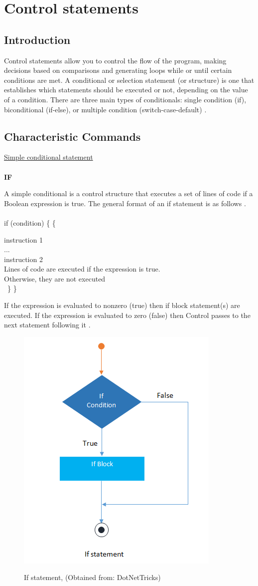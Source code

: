 \documentclass[11pt, letterpaper, english]{article}
\begin{document}
\newpage 
\section{Control statements}
\subsection{Introduction}
\par{Control statements allow you to control the flow of the program, making decisions based on comparisons and generating loops while or until certain conditions are met. A conditional or selection statement (or structure) is one that establishes which statements should be executed or not, depending on the value of a condition. There are three main types of conditionals: single condition (if), biconditional (if-else), or multiple condition (switch-case-default)} \cite{iscyp_2017}.
    \subsection{Characteristic Commands}
    \vspace{1 cm}
    \underline{Simple conditional statement}
   \\
    \\
    \textbf{IF}
    \par{A simple conditional is a control structure that executes a set of lines of code if a Boolean expression is true. The general format of an if statement is as follows \cite{tiwari_2022}}.
    \\
    \\
    if (condition) \{ \{
    
    instruction 1
     \\
     ...
     \\
     instruction 2
     \\
     Lines of code are executed if the expression is true.
     \\
     Otherwise, they are not executed
     \\
\
\}
\}
\\
\par{If the expression is evaluated to nonzero (true) then if block statement(s) are executed. If the expression is evaluated to zero (false) then Control passes to the next statement following it \cite{tiwari_2022}.}
\\
\begin{figure}
	    \centering
		\caption{If statement, (Obtained from: {DotNetTricks})}
		\includegraphics[width=0.2 \textwidth]{ifstatement.png}
		\label{Imagen_if}
	\end{figure}
	
\end{document}
